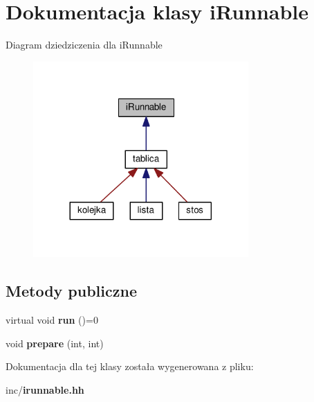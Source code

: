 \section{Dokumentacja klasy i\+Runnable}
\label{classi_runnable}


Diagram dziedziczenia dla i\+Runnable
\nopagebreak
\begin{figure}[H]
\begin{center}
\leavevmode
\includegraphics[width=233pt]{classi_runnable__inherit__graph}
\end{center}
\end{figure}
\subsection*{Metody publiczne}
\begin{DoxyCompactItemize}
\item 
virtual void {\bfseries run} ()=0\label{classi_runnable_afcce018c8ba7233e38139db6235f1c2f}

\item 
void {\bfseries prepare} (int, int)\label{classi_runnable_a6079508bdd977ac2d8c9cdd867debb24}

\end{DoxyCompactItemize}


Dokumentacja dla tej klasy została wygenerowana z pliku\+:\begin{DoxyCompactItemize}
\item 
inc/{\bf irunnable.\+hh}\end{DoxyCompactItemize}
